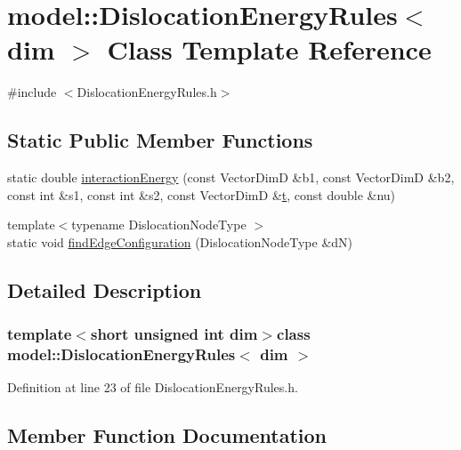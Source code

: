 \hypertarget{classmodel_1_1_dislocation_energy_rules}{}\section{model\+:\+:Dislocation\+Energy\+Rules$<$ dim $>$ Class Template Reference}
\label{classmodel_1_1_dislocation_energy_rules}


{\ttfamily \#include $<$Dislocation\+Energy\+Rules.\+h$>$}

\subsection*{Static Public Member Functions}
\begin{DoxyCompactItemize}
\item 
static double \hyperlink{classmodel_1_1_dislocation_energy_rules_acf8e9cb7a5ec2e63df724242a8ac57d6}{interaction\+Energy} (const Vector\+Dim\+D \&b1, const Vector\+Dim\+D \&b2, const int \&s1, const int \&s2, const Vector\+Dim\+D \&\hyperlink{_cubic_spline_intersection_8m_a83f7cd78c84d2604d0862bd818b9ac29}{t}, const double \&nu)
\item 
{\footnotesize template$<$typename Dislocation\+Node\+Type $>$ }\\static void \hyperlink{classmodel_1_1_dislocation_energy_rules_a2a6f97c7dd7555c5c897307f4e475a54}{find\+Edge\+Configuration} (Dislocation\+Node\+Type \&d\+N)
\end{DoxyCompactItemize}


\subsection{Detailed Description}
\subsubsection*{template$<$short unsigned int dim$>$class model\+::\+Dislocation\+Energy\+Rules$<$ dim $>$}



Definition at line 23 of file Dislocation\+Energy\+Rules.\+h.



\subsection{Member Function Documentation}
\hypertarget{classmodel_1_1_dislocation_energy_rules_a2a6f97c7dd7555c5c897307f4e475a54}{}
